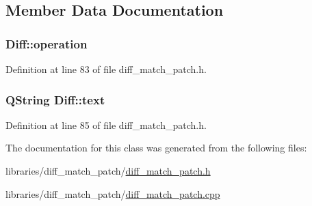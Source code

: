 \subsection{Member Data Documentation}
\hypertarget{class_diff_a134b63b7f79fbb3596a42bb7b2a5140e}{
\subsubsection[{operation}]{ {\bf Diff::operation}}}
\label{class_diff_a134b63b7f79fbb3596a42bb7b2a5140e}


Definition at line 83 of file diff\_\-match\_\-patch.h.

\hypertarget{class_diff_a5aab41a87ff74a0f572962ede20d9f2d}{
\subsubsection[{text}]{\setlength{\rightskip}{0pt plus 5cm}QString {\bf Diff::text}}}
\label{class_diff_a5aab41a87ff74a0f572962ede20d9f2d}


Definition at line 85 of file diff\_\-match\_\-patch.h.



The documentation for this class was generated from the following files:\begin{DoxyCompactItemize}
\item 
libraries/diff\_\-match\_\-patch/\hyperlink{diff__match__patch_8h}{diff\_\-match\_\-patch.h}\item 
libraries/diff\_\-match\_\-patch/\hyperlink{diff__match__patch_8cpp}{diff\_\-match\_\-patch.cpp}\end{DoxyCompactItemize}
